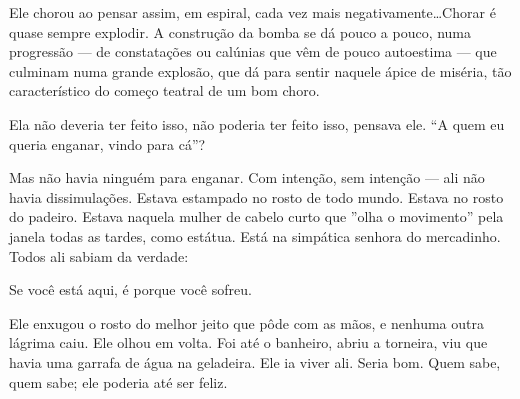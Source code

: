 Ele chorou ao pensar assim, em espiral, cada vez mais negativamente\ldots Chorar é quase sempre explodir. A construção da bomba se dá pouco a pouco, numa progressão --- de constatações ou calúnias que vêm de pouco autoestima --- que culminam numa grande explosão, que dá para sentir naquele ápice de miséria, tão característico do começo teatral de um bom choro.

Ela não deveria ter feito isso, não poderia ter feito isso, pensava ele. ``A quem eu queria enganar, vindo para cá''?

Mas não havia ninguém para enganar. Com intenção, sem intenção --- ali não havia dissimulações. Estava estampado no rosto de todo mundo. Estava no rosto do padeiro. Estava naquela mulher de cabelo curto que ''olha o movimento'' pela janela todas as tardes, como estátua. Está na simpática senhora do mercadinho. Todos ali sabiam da verdade:

Se você está aqui, é porque você sofreu.

Ele enxugou o rosto do melhor jeito que pôde com as mãos, e nenhuma outra lágrima caiu. Ele olhou em volta. Foi até o banheiro, abriu a torneira, viu que havia uma garrafa de água na geladeira. Ele ia viver ali. Seria bom. Quem sabe, quem sabe; ele poderia até ser feliz.
